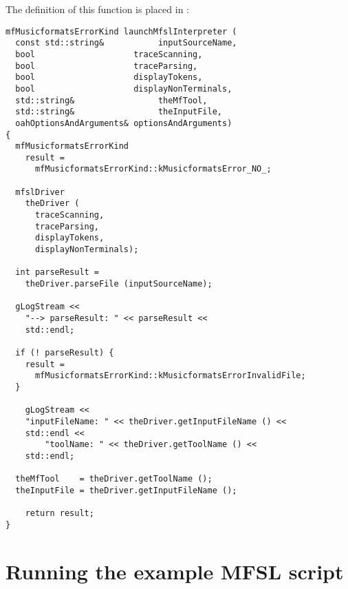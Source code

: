 The definition of this function is placed in :
\begin{lstlisting}[language=Terminal]
mfMusicformatsErrorKind launchMfslInterpreter (
  const std::string&           inputSourceName,
  bool                    traceScanning,
  bool                    traceParsing,
  bool                    displayTokens,
  bool                    displayNonTerminals,
  std::string&                 theMfTool,
  std::string&                 theInputFile,
  oahOptionsAndArguments& optionsAndArguments)
{
  mfMusicformatsErrorKind
    result =
      mfMusicformatsErrorKind::kMusicformatsError_NO_;

  mfslDriver
    theDriver (
      traceScanning,
      traceParsing,
      displayTokens,
      displayNonTerminals);

  int parseResult =
  	theDriver.parseFile (inputSourceName);

  gLogStream <<
    "--> parseResult: " << parseResult <<
    std::endl;

  if (! parseResult) {
    result =
      mfMusicformatsErrorKind::kMusicformatsErrorInvalidFile;
  }

	gLogStream <<
    "inputFileName: " << theDriver.getInputFileName () <<
  	std::endl <<
		"toolName: " << theDriver.getToolName () <<
  	std::endl;

  theMfTool    = theDriver.getToolName ();
  theInputFile = theDriver.getInputFileName ();

	return result;
}
\end{lstlisting}


\section{Running the example MFSL script}

